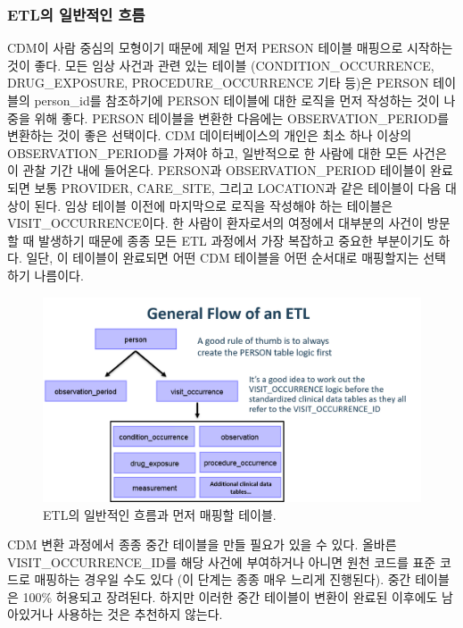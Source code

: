 \documentclass[10.5pt]{book}
\theoremstyle{definition}
\theoremstyle{definition}
\theoremstyle{definition}
\theoremstyle{remark}
\begin{document}
\subsubsection*{ETL의 일반적인 흐름}\label{etl--}

CDM이 사람 중심의 모형이기 때문에 제일 먼저 PERSON 테이블 매핑으로
시작하는 것이 좋다. 모든 임상 사건과 관련 있는 테이블
(CONDITION\_OCCURRENCE, DRUG\_EXPOSURE, PROCEDURE\_OCCURRENCE 기타 등)은
PERSON 테이블의 person\_id를 참조하기에 PERSON 테이블에 대한 로직을 먼저
작성하는 것이 나중을 위해 좋다. PERSON 테이블을 변환한 다음에는
OBSERVATION\_PERIOD를 변환하는 것이 좋은 선택이다. CDM 데이터베이스의
개인은 최소 하나 이상의 OBSERVATION\_PERIOD를 가져야 하고, 일반적으로 한
사람에 대한 모든 사건은 이 관찰 기간 내에 들어온다. PERSON과
OBSERVATION\_PERIOD 테이블이 완료되면 보통 PROVIDER, CARE\_SITE, 그리고
LOCATION과 같은 테이블이 다음 대상이 된다. 임상 테이블 이전에 마지막으로
로직을 작성해야 하는 테이블은 VISIT\_OCCURRENCE이다. 한 사람이
환자로서의 여정에서 대부분의 사건이 방문할 때 발생하기 때문에 종종 모든
ETL 과정에서 가장 복잡하고 중요한 부분이기도 하다. 일단, 이 테이블이
완료되면 어떤 CDM 테이블을 어떤 순서대로 매핑할지는 선택하기 나름이다.

\begin{figure}

{\centering \includegraphics[width=1\linewidth]{images/ExtractTransformLoad/flowOfEtl} 

}

\caption{ETL의 일반적인 흐름과 먼저 매핑할 테이블.}\label{fig:etlFlow}
\end{figure}

CDM 변환 과정에서 종종 중간 테이블을 만들 필요가 있을 수 있다. 올바른
VISIT\_OCCURRENCE\_ID를 해당 사건에 부여하거나 아니면 원천 코드를 표준
코드로 매핑하는 경우일 수도 있다 (이 단계는 종종 매우 느리게 진행된다).
중간 테이블은 100\% 허용되고 장려된다. 하지만 이러한 중간 테이블이
변환이 완료된 이후에도 남아있거나 사용하는 것은 추천하지 않는다.
\end{document}
